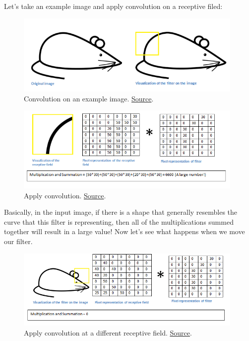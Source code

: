 \documentclass[a4paper]{tufte-handout}
\begin{document}
Let's take an example image and apply convolution on a receptive filed:

\begin{figure}
\includegraphics[width=110mm]{conv_example2.png}
\caption{Convolution on an example image.
\href{https://adeshpande3.github.io/adeshpande3.github.io/A-Beginner's-Guide-To-Understanding-Convolutional-Neural-Networks/}{Source}.
}
\end{figure}

\begin{figure}
\includegraphics[width=110mm]{conv_example3.png}
\caption{Apply convolution.
\href{https://adeshpande3.github.io/adeshpande3.github.io/A-Beginner's-Guide-To-Understanding-Convolutional-Neural-Networks/}{Source}.
}
\end{figure}

Basically, in the input image, if there is a shape that generally
resembles the curve that this filter is representing, then all of the
multiplications summed together will result in a large value! Now let's
see what happens when we move our filter.

\begin{figure}
\includegraphics[width=110mm]{conv_example4.png}
\caption{Apply convolution at a different receptive field.
\href{https://adeshpande3.github.io/adeshpande3.github.io/A-Beginner's-Guide-To-Understanding-Convolutional-Neural-Networks/}{Source}.
}
\end{figure}
\end{document}
